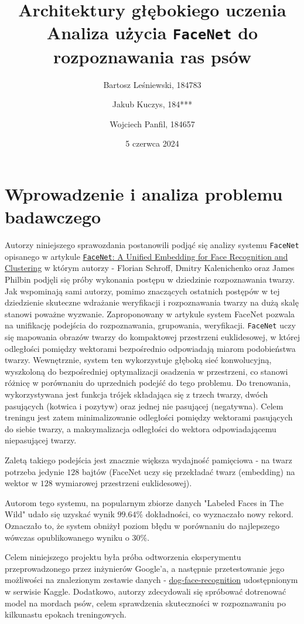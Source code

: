 \documentclass[11pt]{article}
\title{
	\textbf{Architektury głębokiego uczenia}\\
	Analiza użycia \texttt{FaceNet} do rozpoznawania ras psów}
\author{
        Bartosz Leśniewski, 184783
        \and
        Jakub Kuczys, 184***
        \and
        Wojciech Panfil, 184657
      }
\date{5 czerwca 2024}
\begin{document}
	\maketitle

    \justify

    \section{Wprowadzenie i analiza problemu badawczego}
    Autorzy niniejszego sprawozdania postanowili podjąć się analizy systemu \texttt{FaceNet} opisanego w artykule
    \href{https://arxiv.org/abs/1503.03832}{\texttt{FaceNet}: A Unified  Embedding for Face Recognition and Clustering}
    w którym autorzy - Florian Schroff, Dmitry Kalenichenko oraz James Philbin podjęli się próby wykonania postępu
    w dziedzinie rozpoznawania twarzy. Jak wspominają sami autorzy, pomimo znaczących ostatnich postępów w tej dziedzienie
    skuteczne wdrażanie weryfikacji i rozpoznawania twarzy na dużą skalę stanowi poważne wyzwanie. Zaproponowany w artykule
    system FaceNet pozwala na unifikację podejścia do rozpoznawania, grupowania, weryfikacji. \texttt{FaceNet} uczy się mapowania
    obrazów twarzy do kompaktowej przestrzeni euklidesowej, w której odległości pomiędzy wektorami bezpośrednio odpowiadają
    miarom podobieństwa twarzy.
    Wewnętrznie, system ten wykorzystuje głęboką sieć konwolucyjną, wyszkoloną do bezpośredniej optymalizacji
    osadzenia w przestrzeni, co stanowi różnicę w porównaniu do uprzednich podejść do tego problemu. Do trenowania, wykorzystywana jest
    funkcja trójek składająca się z trzech twarzy, dwóch pasujących (kotwica i pozytyw) oraz jednej nie pasującej (negatywna).
    Celem treningu jest zatem minimalizowanie odległości pomiędzy wektorami pasujących do siebie twarzy, a maksymalizacja odległości
    do wektora odpowiadającemu niepasującej twarzy.

    Zaletą takiego podejścia jest znacznie większa wydajność pamięciowa - na twarz potrzeba jedynie $128$ bajtów (FaceNet uczy się przekładać
    twarz (embedding) na wektor w $128$ wymiarowej przestrzeni euklidesowej).

    Autorom tego systemu, na popularnym zbiorze danych "Labeled Faces in The Wild" udało się uzyskać wynik $99.64\%$ dokładności,
    co wyznaczało nowy rekord. Oznaczało to, że system obniżył poziom błędu w porównaniu do najlepszego wówczas opublikowanego wyniku o $30\%$.

    Celem niniejszego projektu była próba odtworzenia eksperymentu przeprowadzonego przez inżynierów Google'a, a następnie przetestowanie
    jego możliwości na znalezionym zestawie danych - \href{https://www.kaggle.com/datasets/wutheringwang/dog-face-recognition}{dog-face-recognition}
    udostępnionym w serwisie Kaggle. Dodatkowo, autorzy zdecydowali się spróbować dotrenować model na mordach psów, celem sprawdzenia skuteczności
    w rozpoznawaniu po kilkunastu epokach treningowych.
\end{document}
